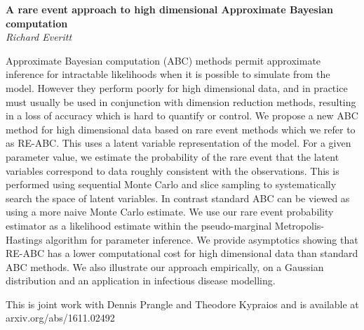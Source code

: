 \documentclass[12pt]{article}
\newcommand{\postertitle}[1]{{\Large\bf #1}\\[12pt]}
\newcommand{\authors}[1]{\emph{#1}\\}
\begin{document}
\begin{center}
\vspace*{0.5cm}
%
\postertitle{A rare event approach to high dimensional Approximate Bayesian computation}
%
\authors{Richard Everitt} %
%
\vspace*{0.3cm}
\end{center}

Approximate Bayesian computation (ABC) methods permit approximate inference for intractable likelihoods when it is possible to simulate from the model. However they perform poorly for high dimensional data, and in practice must usually be used in conjunction with dimension reduction methods, resulting in a loss of accuracy which is hard to quantify or control. We propose a new ABC method for high dimensional data based on rare event methods which we refer to as RE-ABC. This uses a latent variable representation of the model. For a given parameter value, we estimate the probability of the rare event that the latent variables correspond to data roughly consistent with the observations. This is performed using sequential Monte Carlo and slice sampling to systematically search the space of latent variables. In contrast standard ABC can be viewed as using a more naive Monte Carlo estimate. We use our rare event probability estimator as a likelihood estimate within the pseudo-marginal Metropolis-Hastings algorithm for parameter inference. 
We provide asymptotics showing that RE-ABC has a lower computational cost for high dimensional data than standard ABC methods. We also illustrate our approach empirically, on a Gaussian distribution and an application in infectious disease modelling.

This is joint work with Dennis Prangle and Theodore Kypraios and is available at arxiv.org/abs/1611.02492
\end{document}
